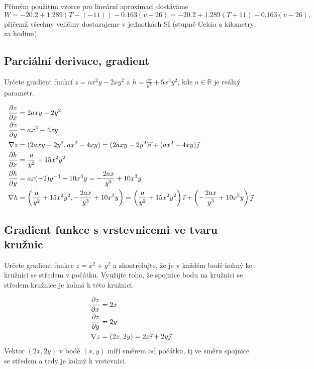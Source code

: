 \reseni

Přímým použitím vzorce pro lineární aproximaci dostáváme
\begin{dmath*}
W=-20.2+1.289(T-(-11))-0.163(v-26)=-20.2+1.289(T+11)-0.163(v-26),
\end{dmath*}
přičemž všechny veličiny dostazujeme v jednotkách SI (stupně Celsia a kilometry za hodinu).

\konec

\subsection{Parciální derivace, gradient}

Určete gradient funkcí $z=ax^2y-2xy^2$ a $h=\frac {ax}{y^2}+5x^3y^2$, kde $a\in\mathbb R$ je reálný parametr.

\reseni
\begin{align*}
  \pdv{z}{x} &= 2axy-2y^2\\
  \pdv{z}{y} &= ax^2-4xy\\
  \nabla z &= (2axy-2y^2, ax^2-4xy) = (2axy-2y^2)\vec \imath + (ax^2-4xy)\vec \jmath\\
  \pdv{h}{x} &= \frac a{y^2}+15x^2y^2\\
  \pdv{h}{y} &= ax(-2)y^{-3}+10x^3y=-\frac{2ax}{y^3}+10x^3y\\
  \nabla h &= \left(\frac a{y^2}+15x^2y^2, -\frac{2ax}{y^3}+10x^3y\right) = \left(\frac a{y^2}+15x^2y^2\right)\vec \imath + \left(-\frac{2ax}{y^3}+10x^3y\right)\vec \jmath
\end{align*}
\konec

\subsection{Gradient funkce s vrstevnicemi ve tvaru kružnic}

Určete gradient funkce $z=x^2+y^2$ a zkontrolujte, že je v každém bodě kolmý ke kružnici se středem v počátku. Využijte toho, že spojnice bodu na kružnici se středem kružnice je kolmá k této kružnici. 

\reseni
\begin{align*}
  \pdv{z}{x} &= 2x\\
  \pdv{z}{y} &= 2y\\
  \nabla z &= (2x, 2y) = 2x\vec \imath + 2y\vec \jmath
\end{align*}
Vektor $(2x,2y)$ v bodě $(x,y)$ míří směrem od počátku, tj ve směru spojnice se středem a tedy je kolmý k vrstevnici.
\konec



